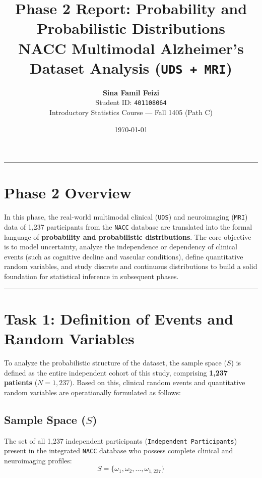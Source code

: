 \documentclass[11pt, a4paper]{article}
\title{
    \textbf{\Large Phase 2 Report: Probability and Probabilistic Distributions} \\[0.4em]
    \large NACC Multimodal Alzheimer's Dataset Analysis (\texttt{UDS + MRI})
}
\author{
    \textbf{Sina Famil Feizi} \\
    Student ID: \texttt{401108064} \\[0.3em]
    \small Introductory Statistics Course --- Fall 1405 (Path C)
}
\date{\today}
\begin{document}
\maketitle
\tableofcontents
\vspace{1em}
\hrule
\vspace{1em}

\section*{Phase 2 Overview}
In this phase, the real-world multimodal clinical (\texttt{UDS}) and neuroimaging (\texttt{MRI}) data of 1,237 participants from the \texttt{NACC} database are translated into the formal language of \textbf{probability and probabilistic distributions}. The core objective is to model uncertainty, analyze the independence or dependency of clinical events (such as cognitive decline and vascular conditions), define quantitative random variables, and study discrete and continuous distributions to build a solid foundation for statistical inference in subsequent phases.

\hrule

\section{Task 1: Definition of Events and Random Variables}
To analyze the probabilistic structure of the dataset, the sample space ($S$) is defined as the entire independent cohort of this study, comprising \textbf{1,237 patients} ($N = 1,237$). Based on this, clinical random events and quantitative random variables are operationally formulated as follows:

\subsection{Sample Space ($S$)}
The set of all 1,237 independent participants (\texttt{Independent Participants}) present in the integrated \texttt{NACC} database who possess complete clinical and neuroimaging profiles:
\[
S = \{ \omega_1, \omega_2, \dots, \omega_{1,237} \}
\]
\end{document}
